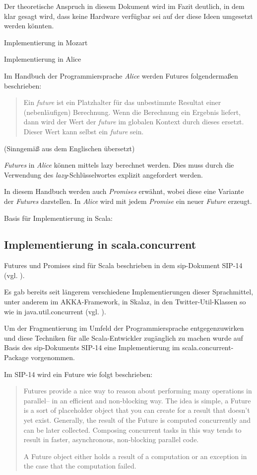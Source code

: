 \documentclass[11pt,a4paper,titlepage,ngerman]{scrartcl}
\begin{document}
Der theoretische Anspruch in diesem Dokument wird im Fazit deutlich, in dem klar 
gesagt wird, dass keine Hardware verfügbar sei auf der diese Ideen umgesetzt 
werden könnten.

Implementierung in Mozart \cite{futures:98}

Implementierung in Alice 
\cite{aliceFuture}

Im Handbuch der Programmiersprache \emph{Alice} werden Futures folgendermaßen
beschrieben:
\begin{quote}
Ein \emph{future} ist ein Platzhalter für das unbestimmte Resultat einer
(nebenläufigen) Berechnung. Wenn die Berechnung ein Ergebnis liefert, dann
wird der Wert der \emph{future} im globalen Kontext durch dieses ersetzt.
Dieser Wert kann selbst ein \emph{future} sein.
\end{quote} (Sinngemäß aus dem Englischen übersetzt)

\emph{Futures} in \emph{Alice} können mittels \gls{lazy} berechnet werden. 
Dies muss durch die Verwendung des \emph{lazy}-Schlüsselwortes explizit angefordert werden.

In diesem Handbuch werden auch \emph{Promises} erwähnt, wobei diese eine Variante
der \emph{Futures} darstellen. In \emph{Alice} wird mit jedem \emph{Promise}
ein neuer \emph{Future} erzeugt.

Basis für Implementierung in Scala: \cite{Lea:2000:JFF:337449.337465}

\subsection{Implementierung in scala.concurrent}

Futures und Promises sind für Scala beschrieben in dem \gls{sip}-Dokument SIP-14 
(vgl. \cite{sip14}).

Es gab bereits seit längerem verschiedene Implementierungen dieser Sprachmittel,
unter anderem im AKKA-Framework, in Skalaz, in den Twitter-Util-Klassen so wie
in java.util.concurrent (vgl. \cite{futuresTry}).

Um der Fragmentierung im Umfeld der Programmiersprache entgegenzuwirken und
diese Techniken für alle Scala-Entwickler zugänglich zu machen wurde auf Basis
des \gls{sip}-Dokuments SIP-14 eine Implementierung im scala.concurrent-Package
vorgenommen.

Im SIP-14 wird ein Future wie folgt beschrieben:
\begin{quote}
Futures provide a nice way to reason about performing many operations in 
parallel– in an efficient and non-blocking way. The idea is simple, a Future 
is a sort of placeholder object that you can create for a result that doesn’t 
yet exist. Generally, the result of the Future is computed concurrently and can 
be later collected. Composing concurrent tasks in this way tends to result in 
faster, asynchronous, non-blocking parallel code.

A Future object either holds a result of a computation or an 
exception in the case that the computation failed.
\end{quote}
\end{document}
